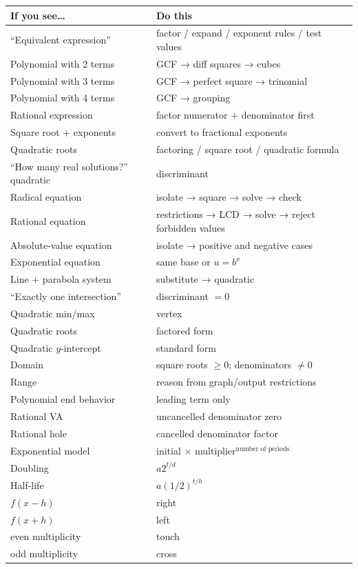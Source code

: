 \documentclass[
]{article}
\newcounter{none} %
\begin{document}
{\def\LTcaptype{none} %
\begin{longtable}[]{@{}
  >{\raggedright\arraybackslash}p{}
  >{\raggedright\arraybackslash}p{}@{}}
\toprule\noalign{}
\begin{minipage}[b]{\linewidth}\raggedright
If you see\ldots{}
\end{minipage} & \begin{minipage}[b]{\linewidth}\raggedright
Do this
\end{minipage} \\
\midrule\noalign{}
\endhead
\bottomrule\noalign{}
\endlastfoot
``Equivalent expression'' & factor / expand / exponent rules / test
values \\
Polynomial with 2 terms & GCF → diff squares → cubes \\
Polynomial with 3 terms & GCF → perfect square → trinomial \\
Polynomial with 4 terms & GCF → grouping \\
Rational expression & factor numerator + denominator first \\
Square root + exponents & convert to fractional exponents \\
Quadratic roots & factoring / square root / quadratic formula \\
``How many real solutions?'' quadratic & discriminant \\
Radical equation & isolate → square → solve → check \\
Rational equation & restrictions → LCD → solve → reject forbidden
values \\
Absolute-value equation & isolate → positive and negative cases \\
Exponential equation & same base or \(u=b^x\) \\
Line + parabola system & substitute → quadratic \\
``Exactly one intersection'' & discriminant \(=0\) \\
Quadratic min/max & vertex \\
Quadratic roots & factored form \\
Quadratic \(y\)-intercept & standard form \\
Domain & square roots \(\ge0\); denominators \(\neq0\) \\
Range & reason from graph/output restrictions \\
Polynomial end behavior & leading term only \\
Rational VA & uncancelled denominator zero \\
Rational hole & cancelled denominator factor \\
Exponential model & initial ×
multiplier\(^{\text{number of periods}}\) \\
Doubling & \(a2^{t/d}\) \\
Half-life & \(a(1/2)^{t/h}\) \\
\(f(x-h)\) & right \\
\(f(x+h)\) & left \\
even multiplicity & touch \\
odd multiplicity & cross \\
\end{longtable}
}
\end{document}

